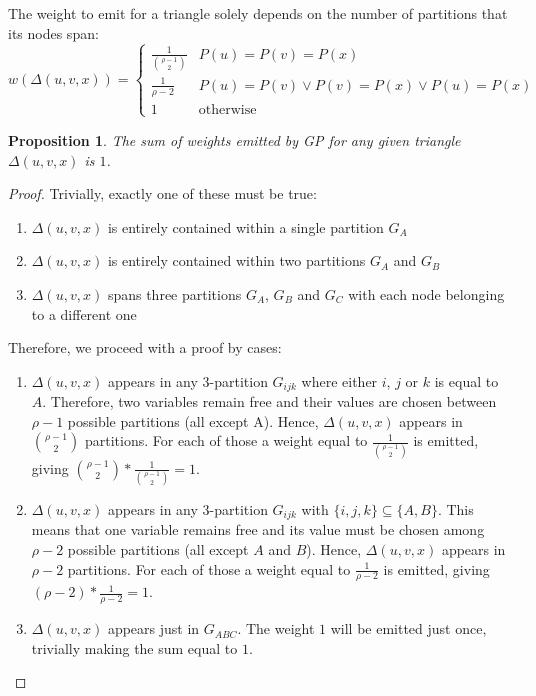 \documentclass[paper=a4, fontsize=11pt]{scrartcl}
\newtheorem{proposition}{Proposition}
\begin{document}
The weight to emit for a triangle solely depends on the number of partitions
that its nodes span:
\[
    w(\Delta(u,v,x)) = \begin{cases}
        \frac{1}{\binom{\rho-1}{2}} & P(u) = P(v) = P(x)  \\
        \frac{1}{\rho-2} & P(u) = P(v) \vee P(v) = P(x) \vee P(u) = P(x) \\
        1 & \text{otherwise}
    \end{cases}
\]

\begin{proposition}
    The sum of weights emitted by GP for any given triangle $\Delta(u, v, x)$ is $1$.
\end{proposition}
\begin{proof}
    Trivially, exactly one of these must be true:
    \begin{enumerate}
        \item $\Delta(u, v, x)$ is entirely contained within a single partition $G_A$
        \item $\Delta(u, v, x)$ is entirely contained within two partitions $G_A$ and $G_B$
        \item $\Delta(u, v, x)$ spans three partitions $G_A$, $G_B$ and $G_C$
        with each node belonging to a different one
    \end{enumerate}
    Therefore, we proceed with a proof by cases:
    \begin{enumerate}
        \item $\Delta(u, v, x)$ appears in any 3-partition $G_{ijk}$ where
        either $i$, $j$ or $k$ is equal to $A$. Therefore, two variables remain
        free and their values are chosen between $\rho-1$ possible partitions
        (all except A). Hence, $\Delta(u, v, x)$ appears in $\binom{\rho-1}{2}$
        partitions. For each of those a weight equal to
        $\frac{1}{\binom{\rho-1}{2}}$ is emitted, giving
        $\binom{\rho-1}{2}*\frac{1}{\binom{\rho-1}{2}}=1$.

        \item $\Delta(u, v, x)$ appears in any 3-partition $G_{ijk}$ with $\{i,
        j, k\} \subseteq \{A, B\}$. This means that one variable remains free
        and its value must be chosen among $\rho-2$ possible partitions (all
        except $A$ and $B$). Hence, $\Delta(u, v, x)$ appears in $\rho-2$
        partitions. For each of those a weight equal to $\frac{1}{\rho-2}$ is
        emitted, giving $(\rho-2)*\frac{1}{\rho-2}=1$.

        \item $\Delta(u, v, x)$ appears just in $G_{ABC}$. The weight $1$ will
        be emitted just once, trivially making the sum equal to $1$.
    \end{enumerate}
\end{proof}
\end{document}

